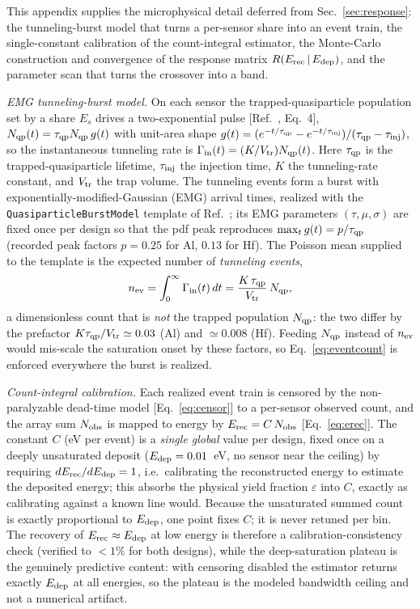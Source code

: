 This appendix supplies the microphysical detail deferred from Sec.~\ref{sec:response}: the tunneling-burst model that turns a per-sensor share into an event train, the single-constant calibration of the count-integral estimator, the Monte-Carlo construction and convergence of the response matrix $R(E_{\rm rec}\,|\,E_{\rm dep})$, and the parameter scan that turns the crossover into a band.

\emph{EMG tunneling-burst model.} On each sensor the trapped-quasiparticle population set by a share $E_s$ drives a two-exponential pulse [Ref.~\cite{ramanathan2026}, Eq.~4], $N_{\rm qp}(t)=\tau_{\rm qp}N_{\rm qp}\,g(t)$ with unit-area shape $g(t)=(e^{-t/\tau_{\rm qp}}-e^{-t/\tau_{\rm inj}})/(\tau_{\rm qp}-\tau_{\rm inj})$, so the instantaneous tunneling rate is $\Gamma_{\rm in}(t)=(K/V_{\rm tr})N_{\rm qp}(t)$. Here $\tau_{\rm qp}$ is the trapped-quasiparticle lifetime, $\tau_{\rm inj}$ the injection time, $K$ the tunneling-rate constant, and $V_{\rm tr}$ the trap volume. The tunneling events form a burst with exponentially-modified-Gaussian (EMG) arrival times, realized with the \texttt{QuasiparticleBurstModel} template of Ref.~\cite{ramanathan2026}; its EMG parameters $(\tau,\mu,\sigma)$ are fixed once per design so that the pdf peak reproduces $\max_t g(t)=p/\tau_{\rm qp}$ (recorded peak factors $p=0.25$ for Al, $0.13$ for Hf). The Poisson mean supplied to the template is the expected number of \emph{tunneling events},
\begin{equation}
n_{\rm ev}=\int_0^\infty \Gamma_{\rm in}(t)\,dt=\frac{K\,\tau_{\rm qp}}{V_{\rm tr}}\,N_{\rm qp},
\label{eq:eventcount}
\end{equation}
a dimensionless count that is \emph{not} the trapped population $N_{\rm qp}$: the two differ by the prefactor $K\tau_{\rm qp}/V_{\rm tr}\simeq0.03$ (Al) and $\simeq0.008$ (Hf). Feeding $N_{\rm qp}$ instead of $n_{\rm ev}$ would mis-scale the saturation onset by these factors, so Eq.~\eqref{eq:eventcount} is enforced everywhere the burst is realized.

\emph{Count-integral calibration.} Each realized event train is censored by the non-paralyzable dead-time model [Eq.~\eqref{eq:censor}] to a per-sensor observed count, and the array sum $N_{\rm obs}$ is mapped to energy by $E_{\rm rec}=C\,N_{\rm obs}$ [Eq.~\eqref{eq:erec}]. The constant $C$ (eV per event) is a \emph{single global} value per design, fixed once on a deeply unsaturated deposit ($E_{\rm dep}=0.01$~eV, no sensor near the ceiling) by requiring $dE_{\rm rec}/dE_{\rm dep}=1$, i.e.\ calibrating the reconstructed energy to estimate the deposited energy; this absorbs the physical yield fraction $\varepsilon$ into $C$, exactly as calibrating against a known line would. Because the unsaturated summed count is exactly proportional to $E_{\rm dep}$, one point fixes $C$; it is never retuned per bin. The recovery of $E_{\rm rec}\approx E_{\rm dep}$ at low energy is therefore a calibration-consistency check (verified to $<1\%$ for both designs), while the deep-saturation plateau is the genuinely predictive content: with censoring disabled the estimator returns exactly $E_{\rm dep}$ at all energies, so the plateau is the modeled bandwidth ceiling and not a numerical artifact.

